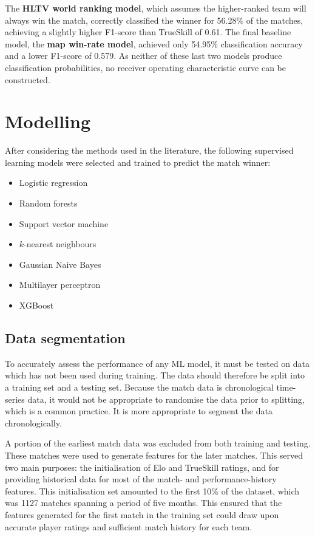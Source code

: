 The \textbf{HLTV world ranking model}, which assumes the higher-ranked team will always win the match, correctly classified the winner for 56.28\% of the matches, achieving a slightly higher F1-score than TrueSkill of 0.61. The final baseline model, the \textbf{map win-rate model}, achieved only 54.95\% classification accuracy and a lower F1-score of 0.579. As neither of these last two models produce classification probabilities, no receiver operating characteristic curve can be constructed.

\section{Modelling}

After considering the methods used in the literature, the following supervised learning models were selected and trained to predict the match winner:

\begin{itemize}
	\item Logistic regression
	\item Random forests
	\item Support vector machine
	\item $k$-nearest neighbours
	\item Gaussian Naive Bayes
	\item Multilayer perceptron
	\item XGBoost
\end{itemize}

\subsection{Data segmentation}

To accurately assess the performance of any ML model, it must be tested on data which has not been used during training. The data should therefore be split into a training set and a testing set. Because the match data is chronological time-series data, it would not be appropriate to randomise the data prior to splitting, which is a common practice. It is more appropriate to segment the data chronologically.

A portion of the earliest match data was excluded from both training and testing. These matches were used to generate features for the later matches. This served two main purposes: the initialisation of Elo and TrueSkill ratings, and for providing historical data for most of the match- and performance-history features. This initialisation set amounted to the first 10\% of the dataset, which was 1127 matches spanning a period of five months. This ensured that the features generated for the first match in the training set could draw upon accurate player ratings and sufficient match history for each team.

